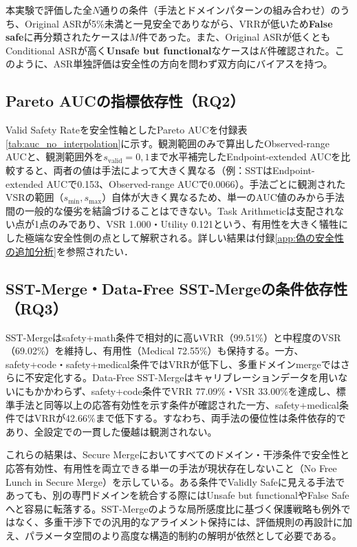 \documentclass{article}
\begin{document}
本実験で評価した全$N$通りの条件（手法とドメインパターンの組み合わせ）のうち、Original ASRが5\%未満と一見安全でありながら、VRRが低いため\textbf{False safe}に再分類されたケースは$M$件であった。また、Original ASRが低くともConditional ASRが高く\textbf{Unsafe but functional}なケースは$K$件確認された。このように、ASR単独評価は安全性の方向を問わず双方向にバイアスを持つ。

\subsection{Pareto AUCの指標依存性（RQ2）}

Valid Safety Rateを安全性軸としたPareto AUCを付録表\ref{tab:auc_no_interpolation}に示す。観測範囲のみで算出したObserved-range AUCと、観測範囲外を\(s_{\text{valid}}=0,1\)まで水平補完したEndpoint-extended AUCを比較すると、両者の値は手法によって大きく異なる（例：SSTはEndpoint-extended AUCで0.153、Observed-range AUCで0.0066）。手法ごとに観測されたVSRの範囲（\(s_{\min}, s_{\max}\)）自体が大きく異なるため、単一のAUC値のみから手法間の一般的な優劣を結論づけることはできない。Task Arithmeticは支配されない点が1点のみであり、VSR 1.000・Utility 0.121という、有用性を大きく犠牲にした極端な安全性側の点として解釈される。詳しい結果は付録\ref{app:偽の安全性の追加分析}を参照されたい．

\subsection{SST-Merge・Data-Free SST-Mergeの条件依存性（RQ3）}

SST-Mergeはsafety+math条件で相対的に高いVRR（99.51\%）と中程度のVSR（69.02\%）を維持し、有用性（Medical 72.55\%）も保持する。一方、safety+code・safety+medical条件ではVRRが低下し、多重ドメインmergeではさらに不安定化する。Data-Free SST-Mergeはキャリブレーションデータを用いないにもかかわらず、safety+code条件でVRR 77.09\%・VSR 33.00\%を達成し、標準手法と同等以上の応答有効性を示す条件が確認された一方、safety+medical条件ではVRRが42.66\%まで低下する。すなわち、両手法の優位性は条件依存的であり、全設定での一貫した優越は観測されない。

これらの結果は、Secure Mergeにおいてすべてのドメイン・干渉条件で安全性と応答有効性、有用性を両立できる単一の手法が現状存在しないこと（No Free Lunch in Secure Merge）を示している。ある条件でValidly Safeに見える手法であっても、別の専門ドメインを統合する際にはUnsafe but functionalやFalse Safeへと容易に転落する。SST-Mergeのような局所感度比に基づく保護戦略も例外ではなく、多重干渉下での汎用的なアライメント保持には、評価規則の再設計に加え、パラメータ空間のより高度な構造的制約の解明が依然として必要である。
\end{document}
